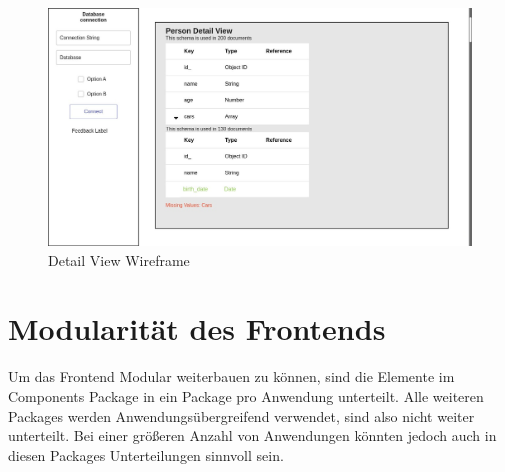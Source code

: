 \begin{figure}[H]
    \includegraphics[width=\textwidth]{images/wireframe_detail_view}
    \caption{Detail View Wireframe}
    \label{fig:wireframe_detail_view}
\end{figure}

\section{Modularität des Frontends}
\label{sec:mod_frontend}

Um das Frontend Modular weiterbauen zu können, sind die Elemente im Components Package in ein Package pro Anwendung unterteilt.
Alle weiteren Packages werden Anwendungsübergreifend verwendet, sind also nicht weiter unterteilt.
Bei einer größeren Anzahl von Anwendungen könnten jedoch auch in diesen Packages Unterteilungen sinnvoll sein.

